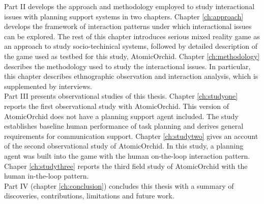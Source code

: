 Part II develops the approach and methodology employed to study interactional issues with planning support systems in two chapters. Chapter \ref{ch:approach} develops the framework of interaction patterns under which interactional issues can be explored. The rest of this chapter introduces serious mixed reality game as an approach to study socio-techinical systems, followed by detailed description of the game used as testbed for this study, AtomicOrchid. Chapter \ref{ch:methodology} describes the methodology used to study the interactional issues. In particular, this chapter describes ethnographic observation and interaction analysis, which is supplemented by interviews. \\ 

Part III presents observational studies of this thesis. Chapter \ref{ch:studyone} reports the first observational study with AtomicOrchid. This version of AtomicOrchid does not have a planning support agent included. The study establishes baseline human performance of task planning and derives general requirements for communication support. Chapter \ref{ch:studytwo} gives an account of the second observational study of AtomicOrchid. In this study, a planning agent was built into the game with the human on-the-loop interaction pattern. Chaper \ref{ch:studythree} reports the third field study of AtomicOrchid with the human in-the-loop pattern. \\ 

Part IV (chapter \ref{ch:conclusion}) concludes this thesis with a summary of discoveries, contributions, limitations and future work.\\










